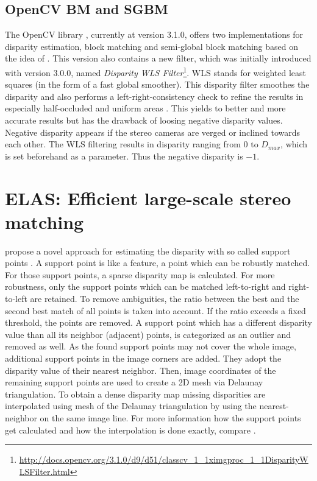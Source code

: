 \subsection*{OpenCV BM and SGBM}

The OpenCV library \citep{opencv_library}, currently at version 3.1.0, offers two implementations for disparity estimation, block matching and semi-global block matching based on the idea of \citeauthor{hirschmuller2005accurate}.
This version also contains a new filter, which was initially introduced with version 3.0.0, named \textit{Disparity WLS Filter}\footnote{\url{http://docs.opencv.org/3.1.0/d9/d51/classcv_1_1ximgproc_1_1DisparityWLSFilter.html}}.
WLS stands for weighted least squares (in the form of a fast global smoother).
This disparity filter smoothes the disparity and also performs a left-right-consistency check to refine the results in especially half-occluded and uniform areas \citep{min2014fast}.
This yields to better and more accurate results but has the drawback of loosing negative disparity values.
Negative disparity appears if the stereo cameras are verged or inclined towards each other.
The WLS filtering results in disparity ranging from $0$ to $D_{max}$, which is set beforehand as a parameter.
Thus the negative disparity is $-1$.

\section{ELAS: Efficient large-scale stereo matching}

\citeauthor{Geiger2010ACCV} propose a novel approach for estimating the disparity with so called support points \citep{Geiger2010ACCV, Geiger2011IV}.
A support point is like a feature, a point which can be robustly matched.
For those support points, a sparse disparity map is calculated.
For more robustness, only the support points which can be matched left-to-right and right-to-left are retained.
To remove ambiguities, the ratio between the best and the second best match of all points is taken into account.
If the ratio exceeds a fixed threshold, the points are removed.
A support point which has a different disparity value than all its neighbor (adjacent) points, is categorized as an outlier and removed as well.
As the found support points may not cover the whole image, additional support points in the image corners are added.
They adopt the disparity value of their nearest neighbor.
Then, image coordinates of the remaining support points are used to create a 2D mesh via Delaunay triangulation.
To obtain a dense disparity map missing disparities are interpolated using mesh of the Delaunay triangulation by using the nearest-neighbor on the same image line.
For more information how the support points get calculated and how the interpolation is done exactly, compare \citep{Geiger2010ACCV, Geiger2011IV}.

